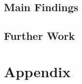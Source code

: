 \documentclass{article}
\begin{document}
\subsection{Main Findings}

\subsection{Further Work}

\raggedright
{}

\newpage
\section{Appendix}
 
\end{document}
